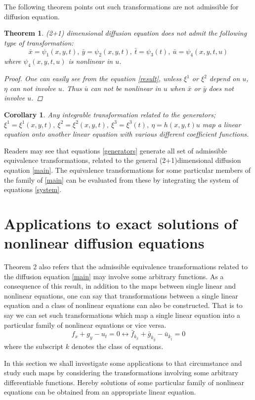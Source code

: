\documentclass[a4paper]{article}
\newtheorem{theorem}{Theorem}
\newtheorem{corollary}{Corollary}
\def\bes{\begin{equation*}}
\def\ees{\end{equation*}}
\begin{document}
The following theorem points out such transformations are not admissible for diffusion equation.
\begin{theorem}
(2+1) dimensional diffusion equation does not admit the following type of transformation:
\bes
\bar x=\psi_1(x,y,t),\ \bar y=\psi_2(x,y,t),\ \bar t=\psi_3(t),\ \bar u=\psi_4(x,y,t,u)\ees
where $\psi_4(x,y,t,u)$ is nonlinear in $u$.
\begin{proof}
One can easily see  from the equation \eqref{result}, unless $\xi^1$ or $\xi^2$ depend on $u$, $\eta$ can not involve $u$. Thus $\bar u$ can not be nonlinear in $u$ when $\bar x$ or $\bar y$ does not involve $u$. 
\end{proof}
\end{theorem}
\begin{corollary}
Any integrable transformation related to the generators; $\xi^1=\xi^1(x,y,t),\ \xi^2=\xi^2(x,y,t),\ \xi^3=\xi^3(t),\ \eta=h(x,y,t)u$  map a linear
equation onto another linear equation
  with various different coefficient functions.
\end{corollary}
Readers may see that equations \eqref{generators} generate all set of admissible equivalence transformations, related to the general (2+1)dimensional diffusion equation  \eqref{main}. The equivalence transformations for some particular members of the family of \eqref{main} can be evaluated from these by integrating the system of equations \eqref{system}.

\section{Applications to exact solutions of nonlinear diffusion equations}
Theorem 2 also refers that the admissible equivalence transformations  related to the diffusion equation \eqref{main} may involve some arbitrary  functions.  As a consequence of this result, in addition to the maps between  single linear and  nonlinear equations,  one can say that transformations between  a  single linear equation and a class of nonlinear equations can also be constructed. That is to say we can set such transformations  which map a single linear equation into a particular family of nonlinear equations or vice versa.
 $$
 f_x+g_y-u_t=0 \longleftrightarrow \bar f_{k_{ \bar x}}+\bar g_{k_{ \bar y}}-\bar u_{k_{ \bar t}}=0
 $$
 where the subscript $k$ denotes  the class of equations.
\par 
 In this section  we shall investigate some applications to that circumstance and study such maps  by considering  the transformations involving some arbitrary differentiable functions. Hereby solutions of some particular family of nonlinear equations can be obtained from an appropriate  linear equation.
\end{document}
